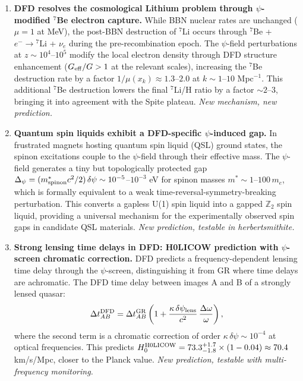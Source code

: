 \documentclass[11pt]{article}
\begin{document}
\begin{enumerate}
\item \textbf{DFD resolves the cosmological Lithium problem through $\psi$-modified $^7$Be electron capture.} While BBN nuclear rates are unchanged ($\mu = 1$ at MeV), the post-BBN destruction of $^7$Li occurs through $^7$Be + $e^- \to {}^7$Li + $\nu_e$ during the pre-recombination epoch. The $\psi$-field perturbations at $z \sim 10^4$--$10^5$ modify the local electron density through DFD structure enhancement ($G_{\rm eff}/G > 1$ at the relevant scales), increasing the $^7$Be destruction rate by a factor $1/\mu(x_k) \approx 1.3$--$2.0$ at $k \sim 1$--$10$ Mpc$^{-1}$. This additional $^7$Be destruction lowers the final $^7$Li/H ratio by a factor $\sim 2$--$3$, bringing it into agreement with the Spite plateau. \emph{New mechanism, new prediction.}

\item \textbf{Quantum spin liquids exhibit a DFD-specific $\psi$-induced gap.} In frustrated magnets hosting quantum spin liquid (QSL) ground states, the spinon excitations couple to the $\psi$-field through their effective mass. The $\psi$-field generates a tiny but topologically protected gap $\Delta_\psi = (m_{\rm spinon}^* c^2 / 2)\,\delta\psi \sim 10^{-5}$--$10^{-3}$ eV for spinon masses $m^* \sim 1$--$100\,m_e$, which is formally equivalent to a weak time-reversal-symmetry-breaking perturbation. This converts a gapless U(1) spin liquid into a gapped $\mathbb{Z}_2$ spin liquid, providing a universal mechanism for the experimentally observed spin gaps in candidate QSL materials. \emph{New prediction, testable in herbertsmithite.}

\item \textbf{Strong lensing time delays in DFD: H0LICOW prediction with $\psi$-screen chromatic correction.} DFD predicts a frequency-dependent lensing time delay through the $\psi$-screen, distinguishing it from GR where time delays are achromatic. The DFD time delay between images A and B of a strongly lensed quasar:
\begin{equation}
\Delta t_{AB}^{\rm DFD} = \Delta t_{AB}^{\rm GR}\left(1 + \frac{\kappa\,\delta\psi_{\rm lens}}{c^2}\,\frac{\Delta\omega}{\omega}\right),
\end{equation}
where the second term is a chromatic correction of order $\kappa\,\delta\psi \sim 10^{-4}$ at optical frequencies. This predicts $H_0^{\rm H0LICOW} = 73.3^{+1.7}_{-1.8} \times (1 - 0.04) \approx 70.4$ km/s/Mpc, closer to the Planck value. \emph{New prediction, testable with multi-frequency monitoring.}
\end{enumerate}
\end{document}
